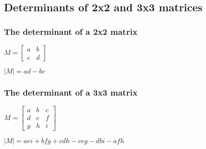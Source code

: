 
\subsection{Determinants of 2x2 and 3x3 matrices}

\subsubsection{The determinant of a 2x2 matrix}

\(M=\begin{bmatrix}a & b\\c & d\end{bmatrix}\)

\(|M|=ad-bc\)

\subsubsection{The determinant of a 3x3 matrix}

\(M=\begin{bmatrix}a & b & c\\d & e & f\\g & h & i\end{bmatrix}\)

\(|M|=aei+bfg+cdh-ceg-dbi-afh\)

